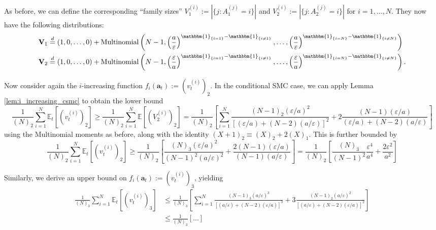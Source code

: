 \documentclass[fleqn]{article}
\theoremstyle{definition}
\newcommand{\E}{\mathbb{E}}
\newcommand{\eqdist}{\overset{d}{=}}
\newcommand{\1}[1]{\mathbbm{1}_{\{#1\}}}
\newcommand{\Mn}{\operatorname{Multinomial}}
\newcommand{\vt}[2][t]{v_{#1}^{(#2)}}
\begin{document}
As before, we can define the corresponding ``family sizes'' $V_1^{(i)} := |\{j: A_1^{(j)}=i\}|$ and $V_2^{(i)} := |\{j: A_2^{(j)}=i\}|$ for $i=1,\dots,N$. They now have the following distributions:
\begin{align*}
& \mathbf{V}_1 \eqdist (1,0,\dots,0) + \Mn\left(N-1, \left( \frac{a}{\varepsilon} \right)^{\1{i=1} -\1{i\neq 1}} ,\dots, \left( \frac{a}{\varepsilon} \right)^{\1{i=N} -\1{i\neq N}} \right) \\
& \mathbf{V}_2 \eqdist (1,0,\dots, 0) + \Mn\left(N-1, \left( \frac{\varepsilon}{a} \right)^{\1{i=1} -\1{i\neq 1}} ,\dots, \left( \frac{\varepsilon}{a} \right)^{\1{i=N} -\1{i\neq N}} \right) .
\end{align*}

Now consider again the $i$-increasing function $f_i(\mathbf{a}_t) := (\vt{i})_2$. In the conditional SMC case, we can apply Lemma \ref{lem:i_increasing_csmc} to obtain the lower bound
\begin{equation*}
\frac{1}{(N)_2} \sum_{i=1}^N \E_t[(\vt{i})_2] \geq \frac{1}{(N)_2} \sum_{i=1}^N \E[(V_2^{(i)})_2]
= \frac{1}{(N)_2} \left[ \sum_{i=1}^N \frac{(N-1)_2 (\varepsilon/a)^2}{[(\varepsilon/a) + (N-2)(a/\varepsilon)]^2} + 2 \frac{(N-1)(\varepsilon/a)}{(\varepsilon/a) + (N-2)(a/\varepsilon)} \right]
\end{equation*}
using the Multinomial moments as before, along with the identity $(X+1)_2 \equiv (X)_2 + 2(X)_1$.
This is further bounded by
\begin{equation*}
\frac{1}{(N)_2} \sum_{i=1}^N \E_t[(\vt{i})_2] 
\geq \frac{1}{(N)_2} \left[ \frac{(N)_3 (\varepsilon/a)^2}{(N-1)^2(a/\varepsilon)^2} + \frac{2(N-1)(\varepsilon/a)}{(N-1)(a/\varepsilon)} \right]
= \frac{1}{(N)_2} \left[ \frac{(N)_3}{(N-1)^2}\frac{\varepsilon^4}{a^4} + \frac{2\varepsilon^2}{a^2} \right] 
\end{equation*}

Similarly, we derive an upper bound on $f_i(\mathbf{a}_t) := (\vt{i})_3$, yielding
\begin{align*}
\frac{1}{(N)_3} \sum_{i=1}^N \E_t[(\vt{i})_3] 
&\leq \frac{1}{(N)_3} \left[ \sum_{i=1}^N \frac{(N-1)_3 (a/\varepsilon)^3}{[(a/\varepsilon) + (N-2)(\varepsilon/a)]^3} + 3 \frac{(N-1)_2 (a/\varepsilon)^2}{[(a/\varepsilon) + (N-2)(\varepsilon/a)]^2} \right] \\
&\leq \frac{1}{(N)_3} \left[ ... \right]
\end{align*}






\end{document}
